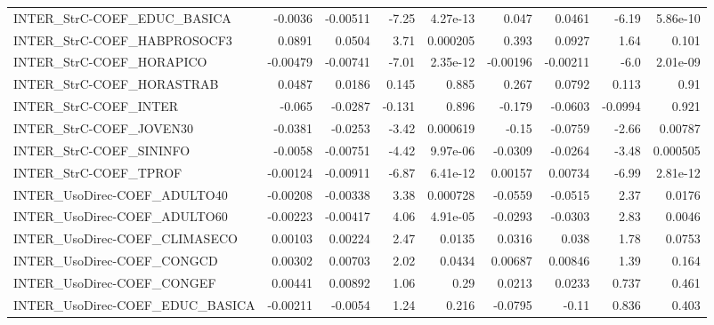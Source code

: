 \begin{tabular}{lrrrrrrrr}
INTER\_StrC-COEF\_EDUC\_BASICA          &     -0.0036 &     -0.00511 &   -7.25 & 4.27e-13 &      0.047 &      0.0461 &        -6.19 &      5.86e-10 \\
INTER\_StrC-COEF\_HABPROSOCF3          &      0.0891 &       0.0504 &    3.71 & 0.000205 &      0.393 &      0.0927 &         1.64 &         0.101 \\
INTER\_StrC-COEF\_HORAPICO             &    -0.00479 &     -0.00741 &   -7.01 & 2.35e-12 &   -0.00196 &    -0.00211 &         -6.0 &      2.01e-09 \\
INTER\_StrC-COEF\_HORASTRAB            &      0.0487 &       0.0186 &   0.145 &    0.885 &      0.267 &      0.0792 &        0.113 &          0.91 \\
INTER\_StrC-COEF\_INTER                &      -0.065 &      -0.0287 &  -0.131 &    0.896 &     -0.179 &     -0.0603 &      -0.0994 &         0.921 \\
INTER\_StrC-COEF\_JOVEN30              &     -0.0381 &      -0.0253 &   -3.42 & 0.000619 &      -0.15 &     -0.0759 &        -2.66 &       0.00787 \\
INTER\_StrC-COEF\_SININFO              &     -0.0058 &     -0.00751 &   -4.42 & 9.97e-06 &    -0.0309 &     -0.0264 &        -3.48 &      0.000505 \\
INTER\_StrC-COEF\_TPROF                &    -0.00124 &     -0.00911 &   -6.87 & 6.41e-12 &    0.00157 &     0.00734 &        -6.99 &      2.81e-12 \\
INTER\_UsoDirec-COEF\_ADULTO40         &    -0.00208 &     -0.00338 &    3.38 & 0.000728 &    -0.0559 &     -0.0515 &         2.37 &        0.0176 \\
INTER\_UsoDirec-COEF\_ADULTO60         &    -0.00223 &     -0.00417 &    4.06 & 4.91e-05 &    -0.0293 &     -0.0303 &         2.83 &        0.0046 \\
INTER\_UsoDirec-COEF\_CLIMASECO        &     0.00103 &      0.00224 &    2.47 &   0.0135 &     0.0316 &       0.038 &         1.78 &        0.0753 \\
INTER\_UsoDirec-COEF\_CONGCD           &     0.00302 &      0.00703 &    2.02 &   0.0434 &    0.00687 &     0.00846 &         1.39 &         0.164 \\
INTER\_UsoDirec-COEF\_CONGEF           &     0.00441 &      0.00892 &    1.06 &     0.29 &     0.0213 &      0.0233 &        0.737 &         0.461 \\
INTER\_UsoDirec-COEF\_EDUC\_BASICA      &    -0.00211 &      -0.0054 &    1.24 &    0.216 &    -0.0795 &       -0.11 &        0.836 &         0.403 \\

\end{tabular}
